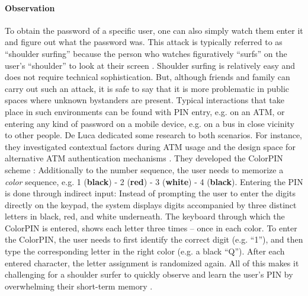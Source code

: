 
\paragraph{Observation} 
To obtain the password of a specific user, one can also simply watch them enter it and figure out what the password was. This attack is typically referred to as ``shoulder surfing'' because the person who watches figuratively ``surfs'' on the user's ``shoulder'' to look at their screen \cite{Tari2006ShoulderSurfingComparison}. Shoulder surfing is relatively easy and does not require technical sophistication. But, although friends and family can carry out such an attack, it is safe to say that it is more problematic in public spaces where unknown bystanders are present. Typical interactions that take place in such environments can be found with PIN entry, e.g. on an ATM, or entering any kind of password on a mobile device, e.g. on a bus in close vicinity to other people. 
De Luca \etal dedicated some research to both scenarios. For instance, they investigated contextual factors during ATM usage and the design space for alternative ATM authentication mechanisms \cite{DeLuca2010UnderstandingATMSecurity}. They developed the ColorPIN scheme \cite{DeLuca2010ColorPIN}: Additionally to the number sequence, the user needs to memorize a \textit{color} sequence, e.g. 1 (\textbf{black}) - 2 (\textbf{red}) - 3 (\textbf{white}) - 4 (\textbf{black}).  Entering the PIN is done through indirect input: Instead of prompting the user to enter the digits directly on the keypad, the system displays digits accompanied by three distinct letters in black, red, and white underneath. The keyboard through which the ColorPIN is entered, shows each letter three times -- once in each color. To enter the ColorPIN, the user needs to first identify the correct digit (e.g. ``1''), and then type the corresponding letter in the right color (e.g. a black ``Q''). After each entered character, the letter assignment is randomized again. All of this makes it challenging for a shoulder surfer to quickly observe and learn the user's PIN by overwhelming their short-term memory \cite{Dunphy2010CloserLookGraphical}.

